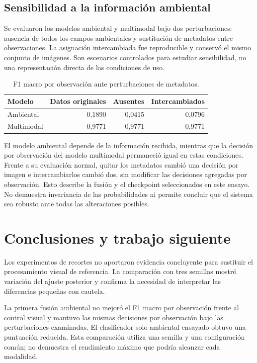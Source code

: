 \documentclass[11pt,a4paper]{article}
\begin{document}
\subsection{Sensibilidad a la información ambiental}
Se evaluaron los modelos ambiental y multimodal bajo dos perturbaciones:
ausencia de todos los campos ambientales y sustitución de metadatos entre
observaciones. La asignación intercambiada fue reproducible y conservó el
mismo conjunto de imágenes. Son escenarios controlados para estudiar
sensibilidad, no una representación directa de las condiciones de uso.

\begin{table}[H]
\centering
\caption{F1 macro por observación ante perturbaciones de metadatos.}
\label{tab:sensibilidad}
\begin{tabular}{lrrr}
\toprule
Modelo & Datos originales & Ausentes & Intercambiados \\
\midrule
Ambiental & 0,1890 & 0,0415 & 0,0796 \\
Multimodal & 0,9771 & 0,9771 & 0,9771 \\
\bottomrule
\end{tabular}
\end{table}

El modelo ambiental depende de la información recibida, mientras que la
decisión por observación del modelo multimodal permaneció igual en estas
condiciones. Frente a su evaluación normal, quitar los metadatos cambió una
decisión por imagen e intercambiarlos cambió dos, sin modificar las decisiones
agregadas por observación. Esto describe la fusión y el checkpoint seleccionados en este
ensayo. No demuestra invariancia de las probabilidades ni permite concluir
que el sistema sea robusto ante todas las alteraciones posibles.

\section{Conclusiones y trabajo siguiente}
Los experimentos de recortes no aportaron evidencia concluyente para sustituir
el procesamiento visual de referencia. La comparación con tres semillas
mostró variación del ajuste posterior y confirma la necesidad de interpretar
las diferencias pequeñas con cautela.

La primera fusión ambiental no mejoró el F1 macro por observación frente al
control visual y mantuvo las mismas decisiones por observación bajo las
perturbaciones examinadas. El clasificador solo ambiental ensayado obtuvo una
puntuación reducida. Esta comparación utiliza una semilla y una configuración
común; no demuestra el rendimiento máximo que podría alcanzar cada modalidad.
\end{document}
